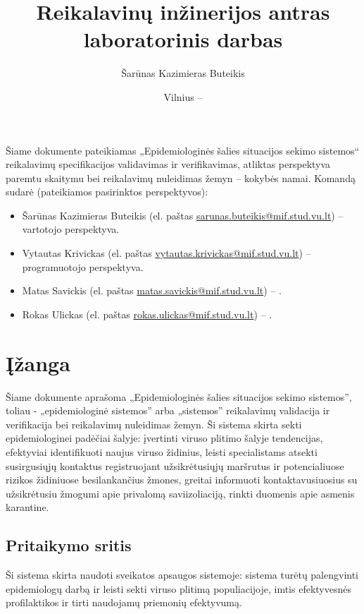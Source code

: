 \documentclass{VUMIFPSkursinis}
\title{Reikalavinų inžinerijos antras laboratorinis darbas}
\author{Šarūnas Kazimieras Buteikis}
\date{Vilnius – \the\year}
\begin{document}
\maketitle


Šiame dokumente pateikiamas „Epidemiologinės šalies situacijos sekimo sistemos“ reikalavimų specifikacijos validavimas ir verifikavimas, atliktas
perspektyva paremtu skaitymu bei reikalavimų nuleidimas žemyn -- kokybės namai. Komandą sudarė (pateikiamos pasirinktos perspektyvos):
\begin{itemize}
	\item Šarūnas Kazimieras Buteikis (el. paštas \href{mailto:sarunas.buteikis@mif.stud.vu.lt}{sarunas.buteikis@mif.stud.vu.lt}) -- vartotojo perspektyva.
	\item Vytautas Krivickas (el. paštas \href{mailto:vytautas.krivickas@mif.stud.vu.lt}{vytautas.krivickas@mif.stud.vu.lt}) -- programuotojo perspektyva.
	\item Matas Savickis (el. paštas \href{mailto:matas.savickis@mif.stud.vu.lt}{matas.savickis@mif.stud.vu.lt}) -- .
	\item Rokas Ulickas (el. paštas \href{mailto:rokas.ulickas@mif.stud.vu.lt}{rokas.ulickas@mif.stud.vu.lt}) -- .
\end{itemize}

\newpage

\tableofcontents


\section{Įžanga}
Šiame dokumente aprašoma „Epidemiologinės šalies situacijos sekimo sistemos”, toliau - „epidemiologinė sistemos” arba „sistemos”
reikalavimų validacija ir verifikacija bei reikalavimų nuleidimas žemyn.
Ši sistema skirta sekti epidemiologinei padėčiai šalyje: įvertinti viruso plitimo šalyje tendencijas,
efektyviai identifikuoti naujus viruso židinius, leisti specialistams atsekti susirgusiųjų
kontaktus registruojant užsikrėtusiųjų maršrutus ir potencialiuose rizikos židiniuose
besilankančius žmones, greitai informuoti kontaktavusiuosius su užsikrėtusiu žmogumi
apie privalomą saviizoliaciją, rinkti duomenis apie asmenis karantine.

\subsection{Pritaikymo sritis}
Ši sistema skirta naudoti sveikatos apsaugos sistemoje: sistema turėtų palengvinti
epidemiologų darbą ir leisti sekti viruso plitimą populiacijoje, imtis efektyvesnės
profilaktikos ir tirti naudojamų priemonių efektyvumą.
\end{document}
